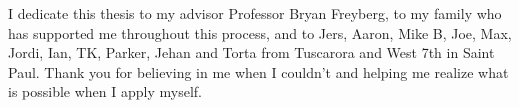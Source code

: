 I dedicate this thesis to my advisor Professor Bryan Freyberg, to my family who has supported me throughout this process, and to Jers, Aaron, Mike B, Joe, Max, Jordi, Ian, TK, Parker, Jehan and Torta from Tuscarora and West 7th in Saint Paul. Thank you for believing in me when I couldn't and helping me realize what is possible when I apply myself.
